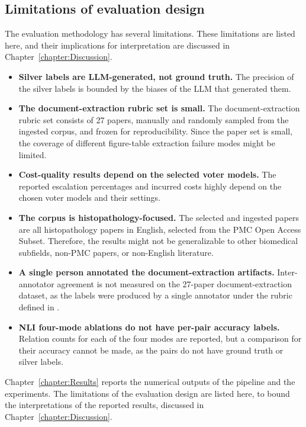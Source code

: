 \subsection{Limitations of evaluation design}\label{subsec:eval-limitations}

The evaluation methodology has several limitations. These limitations are listed here, and their implications for interpretation are discussed in Chapter~\ref{chapter:Discussion}. 



\begin{itemize}
    \item \textbf{Silver labels are LLM-generated, not ground truth.} The precision of the silver labels is bounded by the biases of the LLM that generated them.
    \item \textbf{The document-extraction rubric set is small.} The document-extraction rubric set consists of 27 papers, manually and randomly sampled from the ingested corpus, and frozen for reproducibility. Since the paper set is small, the coverage of different figure-table extraction failure modes might be limited.
    \item \textbf{Cost-quality results depend on the selected voter models.} The reported escalation percentages and incurred costs highly depend on the chosen voter models and their settings.
    \item \textbf{The corpus is histopathology-focused.} The selected and ingested papers are all histopathology papers in English, selected from the PMC Open Access Subset. Therefore, the results might not be generalizable to other biomedical subfields, non-PMC papers, or non-English literature.
    \item \textbf{A single person annotated the document-extraction artifacts.} Inter-annotator agreement is not measured on the 27-paper document-extraction dataset, as the labels were produced by a single annotator under the rubric defined in .
    \item \textbf{NLI four-mode ablations do not have per-pair accuracy labels.} Relation counts for each of the four modes are reported, but a comparison for their accuracy cannot be made, as the pairs do not have ground truth or silver labels.
\end{itemize}

Chapter~\ref{chapter:Results} reports the numerical outputs of the pipeline and the experiments. The limitations of the evaluation design are listed here, to bound the interpretations of the reported results, discussed in Chapter~\ref{chapter:Discussion}.